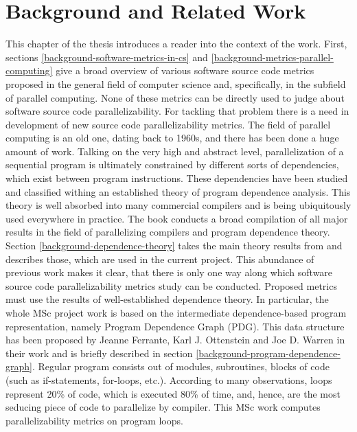 \chapter{Background and Related Work}
\label{backgroud}
\qquad This chapter of the thesis introduces a reader into the context of the work. First, sections \ref{background-software-metrics-in-cs} and \ref{background-metrics-parallel-computing} give a broad overview of various software source code metrics proposed in the general field of computer science and, specifically, in the subfield of parallel computing. None of these metrics can be directly used to judge about software source code parallelizability. For tackling that problem there is a need in development of new source code parallelizability metrics.\newline
\null\qquad The field of parallel computing is an old one, dating back to 1960s, and there has been done a huge amount of work. Talking on the very high and abstract level, parallelization of a sequential program is ultimately constrained by different sorts of dependencies, which exist between program instructions. These dependencies have been studied and classified withing an established theory of program dependence analysis. This theory is well absorbed into many commercial compilers and is being ubiquitously used everywhere in practice. The book \cite{optimizing-compilers-book} conducts a broad compilation of all major results in the field of parallelizing compilers and program dependence theory. Section \ref{background-dependence-theory} takes the main theory results from \cite{optimizing-compilers-book} and describes those, which are used in the current project.\newline
\null\qquad This abundance of previous work makes it clear, that there is only one way along which software source code parallelizability metrics study can be conducted. Proposed metrics must use the results of well-established dependence theory. In particular, the whole MSc project work is based on the intermediate dependence-based program representation, namely Program Dependence Graph (PDG). This data structure has been proposed by Jeanne Ferrante, Karl J. Ottenstein and Joe D. Warren in their work \cite{pdg-paper} and is briefly described in section \ref{background-program-dependence-graph}.\newline
\null\qquad Regular program consists out of modules, subroutines, blocks of code (such as if-statements, for-loops, etc.). According to many observations, loops represent 20\% of code, which is executed 80\% of time, and, hence, are the most seducing piece of code to parallelize by compiler. This MSc work computes parallelizability metrics on program loops.\newline
